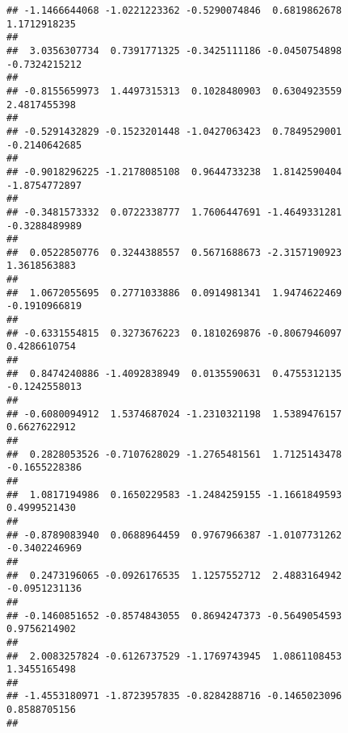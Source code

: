 \documentclass[]{article}
\begin{document}
\begin{verbatim}
## -1.1466644068 -1.0221223362 -0.5290074846  0.6819862678  1.1712918235 
##                                                                       
##  3.0356307734  0.7391771325 -0.3425111186 -0.0450754898 -0.7324215212 
##                                                                       
## -0.8155659973  1.4497315313  0.1028480903  0.6304923559  2.4817455398 
##                                                                       
## -0.5291432829 -0.1523201448 -1.0427063423  0.7849529001 -0.2140642685 
##                                                                       
## -0.9018296225 -1.2178085108  0.9644733238  1.8142590404 -1.8754772897 
##                                                                       
## -0.3481573332  0.0722338777  1.7606447691 -1.4649331281 -0.3288489989 
##                                                                       
##  0.0522850776  0.3244388557  0.5671688673 -2.3157190923  1.3618563883 
##                                                                       
##  1.0672055695  0.2771033886  0.0914981341  1.9474622469 -0.1910966819 
##                                                                       
## -0.6331554815  0.3273676223  0.1810269876 -0.8067946097  0.4286610754 
##                                                                       
##  0.8474240886 -1.4092838949  0.0135590631  0.4755312135 -0.1242558013 
##                                                                       
## -0.6080094912  1.5374687024 -1.2310321198  1.5389476157  0.6627622912 
##                                                                       
##  0.2828053526 -0.7107628029 -1.2765481561  1.7125143478 -0.1655228386 
##                                                                       
##  1.0817194986  0.1650229583 -1.2484259155 -1.1661849593  0.4999521430 
##                                                                       
## -0.8789083940  0.0688964459  0.9767966387 -1.0107731262 -0.3402246969 
##                                                                       
##  0.2473196065 -0.0926176535  1.1257552712  2.4883164942 -0.0951231136 
##                                                                       
## -0.1460851652 -0.8574843055  0.8694247373 -0.5649054593  0.9756214902 
##                                                                       
##  2.0083257824 -0.6126737529 -1.1769743945  1.0861108453  1.3455165498 
##                                                                       
## -1.4553180971 -1.8723957835 -0.8284288716 -0.1465023096  0.8588705156 
##                                                                       

\end{verbatim}
\end{document}

